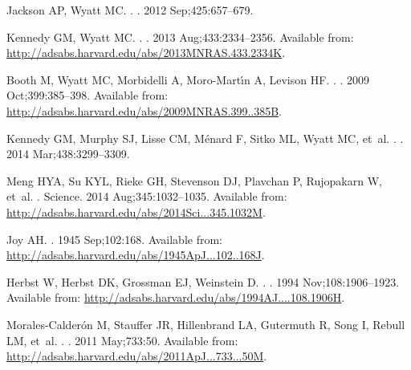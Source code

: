\documentclass[]{rsos}
\begin{document}
\begin{thebibliography}{10}
{Jackson} AP, {Wyatt} MC.
.
\newblock \mnras. 2012 Sep;425:657--679.

{Kennedy} GM, {Wyatt} MC.
.
\newblock \mnras. 2013 Aug;433:2334--2356.
\newblock Available from:
  \url{http://adsabs.harvard.edu/abs/2013MNRAS.433.2334K}.

{Booth} M, {Wyatt} MC, {Morbidelli} A, {Moro-Mart{\'{\i}}n} A, {Levison} HF.
.
\newblock \mnras. 2009 Oct;399:385--398.
\newblock Available from:
  \url{http://adsabs.harvard.edu/abs/2009MNRAS.399..385B}.

{Kennedy} GM, {Murphy} SJ, {Lisse} CM, {M{\'e}nard} F, {Sitko} ML, {Wyatt} MC,
  et~al.
.
\newblock \mnras. 2014 Mar;438:3299--3309.

{Meng} HYA, {Su} KYL, {Rieke} GH, {Stevenson} DJ, {Plavchan} P, {Rujopakarn} W,
  et~al.
.
\newblock Science. 2014 Aug;345:1032--1035.
\newblock Available from:
  \url{http://adsabs.harvard.edu/abs/2014Sci...345.1032M}.

{Joy} AH.
\newblock \apj. 1945 Sep;102:168.
\newblock Available from:
  \url{http://adsabs.harvard.edu/abs/1945ApJ...102..168J}.

{Herbst} W, {Herbst} DK, {Grossman} EJ, {Weinstein} D.
.
\newblock \aj. 1994 Nov;108:1906--1923.
\newblock Available from:
  \url{http://adsabs.harvard.edu/abs/1994AJ....108.1906H}.

{Morales-Calder{\'o}n} M, {Stauffer} JR, {Hillenbrand} LA, {Gutermuth} R,
  {Song} I, {Rebull} LM, et~al.
.
\newblock \apj. 2011 May;733:50.
\newblock Available from:
  \url{http://adsabs.harvard.edu/abs/2011ApJ...733...50M}.


\end{thebibliography}
\end{document}
